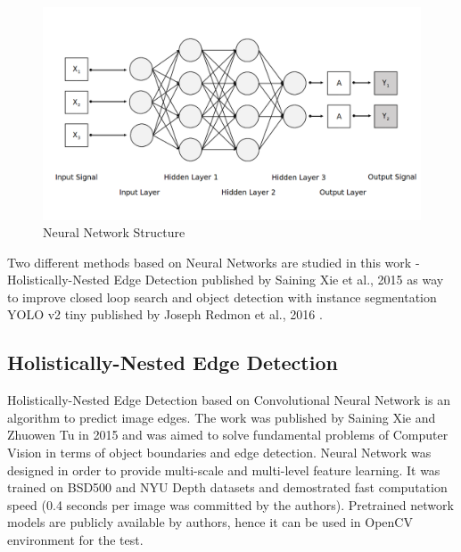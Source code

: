\documentclass{ctuthesis}
\begin{document}
\begin{figure}[htbp]
    \centering
    \includegraphics[width=\textwidth]{nn_arch.png}
    \caption{Neural Network Structure}
    \label{fig:nn}
\end{figure}

Two different methods based on Neural Networks are studied in this work - Holistically-Nested Edge Detection published by Saining Xie et al., 2015 \cite{hne} as way to improve closed loop search and object detection with instance segmentation YOLO v2 tiny published by Joseph Redmon et al., 2016 \cite{yolo}.

\subsection{Holistically-Nested Edge Detection}

Holistically-Nested Edge Detection based on Convolutional Neural Network is an algorithm to predict image edges. The work was published by Saining Xie and Zhuowen Tu in 2015 \cite{hne} and was aimed to solve fundamental problems of Computer Vision in terms of object boundaries and edge detection. Neural Network was designed in order to provide multi-scale and multi-level feature learning. It was trained on BSD500 and NYU Depth datasets and demostrated fast computation speed (0.4 seconds per image was committed by the authors). Pretrained network models are publicly available by authors, hence it can be used in OpenCV environment for the test.
\end{document}
